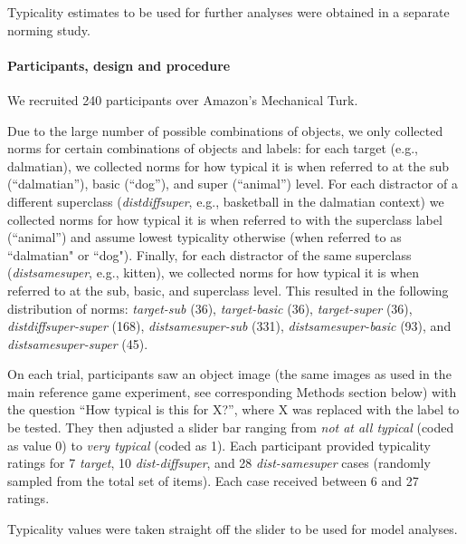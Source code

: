 \documentclass[10pt,letterpaper]{article}
\newcommand{\ndg}[1]{\textcolor{Green}{[ndg: #1]}}
\newcommand{\jd}[1]{\textcolor{Blue}{[jd: #1]}}
\begin{document}
Typicality estimates to be used for further analyses were obtained in a separate norming study. 

\paragraph{\bf Participants, design and procedure}
We recruited 240 participants over Amazon's Mechanical Turk.

Due to the large number of possible combinations of objects, we only collected norms for certain combinations of objects and labels: for each target (e.g., dalmatian), we collected norms for how typical it is when referred to at the sub (``dalmatian''), basic (``dog''), and super (``animal'') level. For each distractor of a different superclass (\emph{distdiffsuper}, e.g., basketball in the dalmatian context) we collected norms for how typical it is when referred to with the superclass label (``animal'') and assume lowest typicality otherwise (when referred to as ``dalmatian" or ``dog"). Finally, for each distractor of the same superclass (\emph{distsamesuper}, e.g., kitten), we collected norms for how typical it is when referred to at the sub, basic, and superclass level. This resulted in the following distribution of norms:  \emph{target-sub} (36), \emph{target-basic} (36), \emph{target-super} (36), \emph{distdiffsuper-super} (168), \emph{distsamesuper-sub} (331), \emph{distsamesuper-basic} (93), and \emph{distsamesuper-super} (45). 

On each trial, participants saw an object image (the same images as used in the main reference game experiment, see corresponding Methods section below) with the question ``How typical is this for X?'', where X was replaced with the label to be tested. They then adjusted a slider bar ranging from \emph{not at all typical} (coded as value 0) to \emph{very typical} (coded as 1). Each participant provided typicality ratings for 7 \emph{target}, 10 \emph{dist-diffsuper}, and 28 \emph{dist-samesuper} cases (randomly sampled from the total set of items). Each case received between 6 and 27 ratings. 

Typicality values were taken straight off the slider to be used for model analyses.


\end{document}
